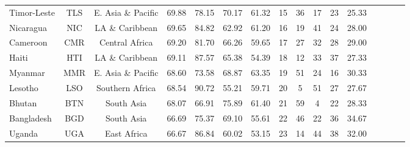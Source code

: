 \begin{longtable}[H]{lccccccccccccccc}
Timor-Leste                       & TLS           & E. Asia \& Pacific & 69.88       & 78.15            & 70.17                     & 61.32           & 15             & 36                  & 17                           & 23                 & 25.33                  \\
Nicaragua                         & NIC           & LA \& Caribbean    & 69.65       & 84.82            & 62.92                     & 61.20           & 16             & 19                  & 41                           & 24                 & 28.00                  \\
Cameroon                          & CMR           & Central Africa     & 69.20       & 81.70            & 66.26                     & 59.65           & 17             & 27                  & 32                           & 28                 & 29.00                  \\
Haiti                             & HTI           & LA \& Caribbean    & 69.11       & 87.57            & 65.38                     & 54.39           & 18             & 12                  & 33                           & 37                 & 27.33                  \\
Myanmar                           & MMR           & E. Asia \& Pacific & 68.60       & 73.58            & 68.87                     & 63.35           & 19             & 51                  & 24                           & 16                 & 30.33                  \\
Lesotho                           & LSO           & Southern Africa    & 68.54       & 90.72            & 55.21                     & 59.71           & 20             & 5                   & 51                           & 27                 & 27.67                  \\
Bhutan                            & BTN           & South Asia         & 68.07       & 66.91            & 75.89                     & 61.40           & 21             & 59                  & 4                            & 22                 & 28.33                  \\
Bangladesh                        & BGD           & South Asia         & 66.69       & 75.37            & 69.10                     & 55.61           & 22             & 46                  & 22                           & 36                 & 34.67                  \\
Uganda                            & UGA           & East Africa        & 66.67       & 86.84            & 60.02                     & 53.15           & 23             & 14                  & 44                           & 38                 & 32.00                  \\

\end{longtable}
